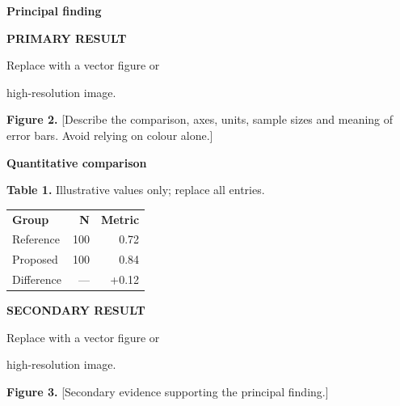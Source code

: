 \documentclass{article}
\newcommand{\sectionhead}[2]{\par\vspace{9mm}{\color{gold}\fontsize{22}{27}\selectfont #1\quad}{\color{navy}\bfseries\fontsize{36}{42}\selectfont #2}\par\vspace{-4mm}{\color{gold}\rule{\linewidth}{1mm}}\par}
\newcommand{\prompt}[1]{{\color{ink}#1}\par}
\newcommand{\figurebox}[2]{\par\begingroup\setlength{\fboxsep}{6mm}\colorbox{pale}{\parbox[c][#1][c]{\dimexpr\linewidth-12mm\relax}{\centering\color{navy}\bfseries #2\par\normalfont\fontsize{23}{30}\selectfont Replace with a vector figure or\par high-resolution image.}}\endgroup\par}
\begin{document}
\begin{minipage}[t]{0.315\textwidth}\vspace{0pt}
\sectionhead{04}{Results}
\prompt{\textbf{Principal finding}\par [Report the main effect with units, sample size and an appropriate uncertainty interval.]}
\figurebox{180mm}{PRIMARY RESULT\par [Plot / image / diagram]}
{\fontsize{23}{30}\selectfont\textbf{Figure 2.} [Describe the comparison, axes, units, sample sizes and meaning of error bars. Avoid relying on colour alone.]\par}
\prompt{\textbf{Quantitative comparison}\par [Explain the most important pattern in Table 1.]}
{\fontsize{23}{29}\selectfont\textbf{Table 1.} Illustrative values only; replace all entries.\par
\renewcommand{\arraystretch}{1.6}
\begin{tabular*}{\linewidth}{@{\extracolsep{\fill}}lrr@{}}
\rowcolor{navy}\color{white}\textbf{Group}&\color{white}\textbf{N}&\color{white}\textbf{Metric}\tabularnewline
\rowcolor{pale} Reference & 100 & 0.72\tabularnewline
Proposed & 100 & 0.84\tabularnewline
\rowcolor{pale} Difference & --- & +0.12\tabularnewline
\end{tabular*}\par
[Specify metric, units, summary statistic and uncertainty.]\par}
\figurebox{100mm}{SECONDARY RESULT\par [Robustness / subgroup analysis]}
{\fontsize{23}{30}\selectfont\textbf{Figure 3.} [Secondary evidence supporting the principal finding.]\par}
\end{minipage}\hfill
\end{document}
